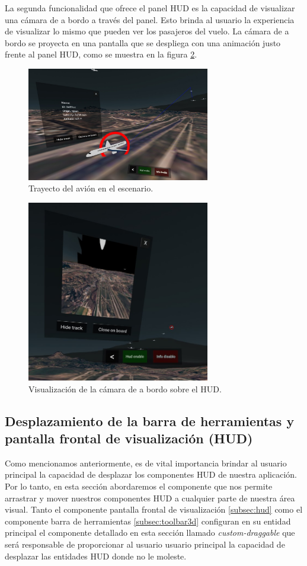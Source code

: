 \documentclass[a4paper, 11pt]{book}
\begin{document}
La segunda funcionalidad que ofrece el panel \textsc{\gls{HUD}} es la capacidad de visualizar una cámara de a bordo a través del panel. Esto brinda al usuario la experiencia de visualizar lo mismo que pueden ver los pasajeros del vuelo. La cámara de a bordo se proyecta en una pantalla que se despliega con una animación justo frente al panel \textsc{\gls{HUD}}, como se muestra en la figura \ref{fig:cameraOnBoard}.\\
\begin{figure}[h]
	\centering
	\includegraphics[width=8cm, keepaspectratio]{img/show_track.jpg}
	\caption{Trayecto del avión en el escenario.}
	\label{fig:showTrack}
\end{figure}
\begin{figure}[h]
  \centering
  \includegraphics[width=8cm, keepaspectratio]{img/cameraOnBoard.jpg}
  \caption{Visualización de la cámara de a bordo sobre el HUD.}
  \label{fig:cameraOnBoard}
\end{figure}
\subsection{Desplazamiento de la barra de herramientas y pantalla frontal de visualización (HUD)}
\label{subsec:customDraggable}
Como mencionamos anteriormente, es de vital importancia brindar al usuario principal la capacidad de desplazar los componentes \textsc{\gls{HUD}} de nuestra aplicación. Por lo tanto, en esta sección abordaremos el componente que nos permite arrastrar y mover nuestros componentes \textsc{\gls{HUD}} a cualquier parte de nuestra área visual.
Tanto el componente pantalla frontal de visualización \ref{subsec:hud} como el componente barra de herramientas \ref{subsec:toolbar3d} configuran en su entidad principal el componente detallado en esta sección llamado \emph{custom-draggable} que será responsable de proporcionar al usuario usuario principal la capacidad de desplazar las entidades \textsc{HUD} donde no le moleste.
\end{document}
